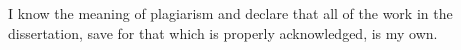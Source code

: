 {
  \makeatletter
    \thispagestyle{empty}
    \renewcommand{\thefootnote}{}
    \mbox{}\vfill
    I know the meaning of plagiarism and declare that all of the work in the dissertation, save for that which is properly acknowledged, is my own.
    
    \vspace{15mm}
    
    \mbox{}\hfill\begin{minipage}{65mm}%
      \dotfill\\[1ex]%
      \@author
    \end{minipage}
    \vfill\vfill\vfill
  \makeatother
  \clearpage
}
